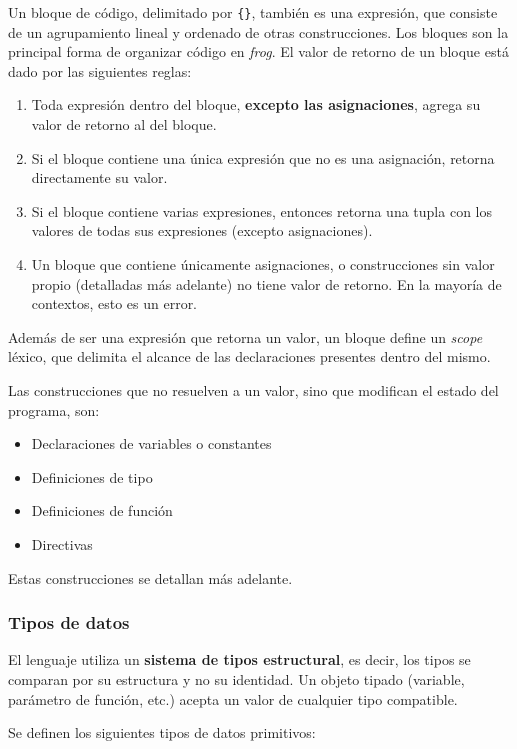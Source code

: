 Un bloque de código, delimitado por \texttt{\{\}}, también es una expresión, que consiste de un agrupamiento lineal y ordenado de otras construcciones. Los bloques son la principal forma de organizar código en \textit{frog}. El valor de retorno de un bloque está dado por las siguientes reglas:

\begin{enumerate}
	\item Toda expresión dentro del bloque, \textbf{excepto las asignaciones}, agrega su valor de retorno al del bloque.
	\item Si el bloque contiene una única expresión que no es una asignación, retorna directamente su valor.
	\item Si el bloque contiene varias expresiones, entonces retorna una tupla con los valores de todas sus expresiones (excepto asignaciones).
	\item Un bloque que contiene únicamente asignaciones, o construcciones sin valor propio (detalladas más adelante) no tiene valor de retorno. En la mayoría de contextos, esto es un error.
\end{enumerate}

Además de ser una expresión que retorna un valor, un bloque define un \textit{scope} léxico, que delimita el alcance de las declaraciones presentes dentro del mismo.

Las construcciones que no resuelven a un valor, sino que modifican el estado del programa, son:

\begin{itemize}
	\item Declaraciones de variables o constantes
	\item Definiciones de tipo
	\item Definiciones de función
	\item Directivas
\end{itemize}

Estas construcciones se detallan más adelante.

\subsubsection{Tipos de datos}

El lenguaje utiliza un \textbf{sistema de tipos estructural}, es decir, los tipos se comparan por su estructura y no su identidad. Un objeto tipado (variable, parámetro de función, etc.) acepta un valor de cualquier tipo compatible.

Se definen los siguientes tipos de datos primitivos:

